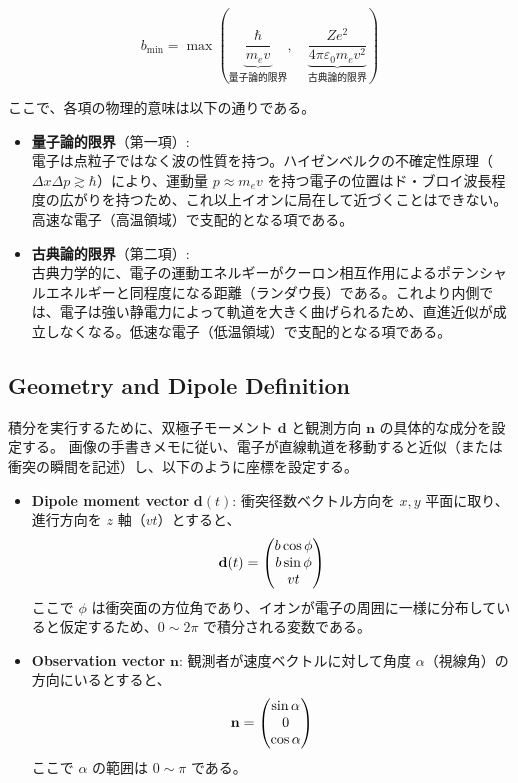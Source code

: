 \documentclass[a4paper,11pt]{bxjsarticle} %
\begin{document}
\begin{equation}
    b_{\min} = \max\left( \underbrace{\frac{\hbar}{m_e v}}_{\text{量子論的限界}}, \quad \underbrace{\frac{Z e^2}{4\pi\varepsilon_0 m_e v^2}}_{\text{古典論的限界}} \right)
\end{equation}

ここで、各項の物理的意味は以下の通りである。

\begin{itemize}
    \item \textbf{量子論的限界}（第一項）: \\
    電子は点粒子ではなく波の性質を持つ。ハイゼンベルクの不確定性原理（$\Delta x \Delta p \gtrsim \hbar$）により、運動量 $p \approx m_e v$ を持つ電子の位置はド・ブロイ波長程度の広がりを持つため、これ以上イオンに局在して近づくことはできない。高速な電子（高温領域）で支配的となる項である。
    
    \item \textbf{古典論的限界}（第二項）: \\
    古典力学的に、電子の運動エネルギーがクーロン相互作用によるポテンシャルエネルギーと同程度になる距離（ランダウ長）である。これより内側では、電子は強い静電力によって軌道を大きく曲げられるため、直進近似が成立しなくなる。低速な電子（低温領域）で支配的となる項である。
\end{itemize}


\subsection{Geometry and Dipole Definition}
積分を実行するために、双極子モーメント $\mathbf{d}$ と観測方向 $\mathbf{n}$ の具体的な成分を設定する。
画像の手書きメモに従い、電子が直線軌道を移動すると近似（または衝突の瞬間を記述）し、以下のように座標を設定する。

\begin{itemize}
    \item \textbf{Dipole moment vector} $\mathbf{d}(t)$:
    衝突径数ベクトル方向を $x, y$ 平面に取り、進行方向を $z$ 軸（$vt$）とすると、
    \begin{equation}
        \mathbf{d}(t) = \mqty(b \cos\phi \\ b \sin\phi \\ vt)
    \end{equation}
    ここで $\phi$ は衝突面の方位角であり、イオンが電子の周囲に一様に分布していると仮定するため、$0 \sim 2\pi$ で積分される変数である。

    \item \textbf{Observation vector} $\mathbf{n}$:
    観測者が速度ベクトルに対して角度 $\alpha$（視線角）の方向にいるとすると、
    \begin{equation}
        \mathbf{n} = \mqty(\sin\alpha \\ 0 \\ \cos\alpha)
    \end{equation}
    ここで $\alpha$ の範囲は $0 \sim \pi$ である。
\end{itemize}
\end{document}
